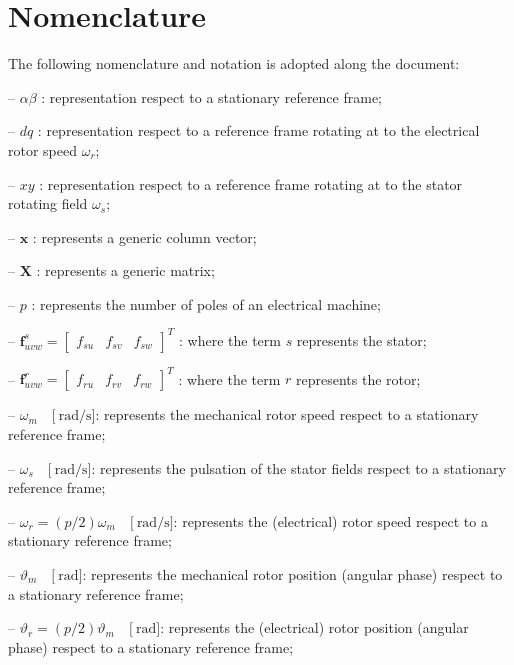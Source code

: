 \documentclass[11pt,a4paper,oneside]{book}
\numberwithin{equation}{section}
\theoremstyle{it}
\theoremstyle{definition}
\newenvironment{myitemize_2}
{ \begin{itemize}[topsep=2pt]
		\setlength{\topsep}{4pt}		
		\setlength{\itemsep}{4pt}
		\setlength{\parskip}{4pt}
		\setlength{\parsep}{4pt}     }
	{ \end{itemize}                  }
\begin{document}
\section{Nomenclature}
The following nomenclature and notation is adopted along the document:
\begin{changemargin}{0.5cm}{3cm} 
\begin{myitemize_2}
	\item[--] $\alpha\beta$ : representation respect to a stationary reference frame;	
	\item[--] $dq$ : representation respect to a reference frame rotating at to the electrical rotor speed $\omega_{r}$;	
	\item[--] $xy$ : representation respect to a reference frame rotating at to the stator rotating field $\omega_{s}$;
	\item[--] $\mathbf{x}$ : represents a generic column vector;	
	\item[--] $\mathbf{X}$ : represents a generic matrix;
	\item[--] $p$ : represents the number of poles of an electrical machine;
	\item[--] $\mathbf{f}_{uvw}^s =\begin{bmatrix} f_{su} & f_{sv} & f_{sw} \end{bmatrix}^T$ : where the term $s$ represents the stator;
	\item[--] $\mathbf{f}_{uvw}^r =\begin{bmatrix} f_{ru} & f_{rv} & f_{rw} \end{bmatrix}^T$ : where the term $r$ represents the rotor;
	\item[--] $\omega_m\quad\Big[\SI{}{\radian\per\second}\Big]$: represents the mechanical rotor speed respect to a stationary reference frame;
	\item[--] $\omega_s\quad\Big[\SI{}{\radian\per\second}\Big]$: represents the pulsation of the stator fields respect to a stationary reference frame;
	\item[--] $\omega_r=(p/2)\omega_m\quad\Big[\SI{}{\radian\per\second}\Big]$: represents the (electrical) rotor speed respect to a stationary reference frame;
	\item[--] $\vartheta_m\quad\Big[\SI{}{\radian}\Big]$: represents the mechanical rotor position (angular phase) respect to a stationary reference frame;
	\item[--] $\vartheta_r=(p/2)\vartheta_m\quad\Big[\SI{}{\radian}\Big]$: represents the (electrical) rotor position (angular phase) respect to a stationary reference frame;

\end{myitemize_2}
\end{changemargin}
\end{document}
